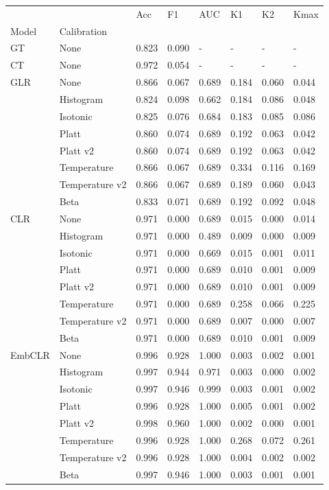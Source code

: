 \begin{tabular}{llllllll}
\toprule
 &  & Acc & F1 & AUC & K1 & K2 & Kmax \\
Model & Calibration &  &  &  &  &  &  \\
\midrule
GT & None & 0.823 & 0.090 & - & - & - & - \\
\cline{1-8}
CT & None & 0.972 & 0.054 & - & - & - & - \\
\cline{1-8}
\multirow[t]{8}{*}{GLR} & None & 0.866 & 0.067 & 0.689 & 0.184 & 0.060 & 0.044 \\
 & Histogram & 0.824 & 0.098 & 0.662 & 0.184 & 0.086 & 0.048 \\
 & Isotonic & 0.825 & 0.076 & 0.684 & 0.183 & 0.085 & 0.086 \\
 & Platt & 0.860 & 0.074 & 0.689 & 0.192 & 0.063 & 0.042 \\
 & Platt v2 & 0.860 & 0.074 & 0.689 & 0.192 & 0.063 & 0.042 \\
 & Temperature & 0.866 & 0.067 & 0.689 & 0.334 & 0.116 & 0.169 \\
 & Temperature v2 & 0.866 & 0.067 & 0.689 & 0.189 & 0.060 & 0.043 \\
 & Beta & 0.833 & 0.071 & 0.689 & 0.192 & 0.092 & 0.048 \\
\cline{1-8}
\multirow[t]{8}{*}{CLR} & None & 0.971 & 0.000 & 0.689 & 0.015 & 0.000 & 0.014 \\
 & Histogram & 0.971 & 0.000 & 0.489 & 0.009 & 0.000 & 0.009 \\
 & Isotonic & 0.971 & 0.000 & 0.669 & 0.015 & 0.001 & 0.011 \\
 & Platt & 0.971 & 0.000 & 0.689 & 0.010 & 0.001 & 0.009 \\
 & Platt v2 & 0.971 & 0.000 & 0.689 & 0.010 & 0.001 & 0.009 \\
 & Temperature & 0.971 & 0.000 & 0.689 & 0.258 & 0.066 & 0.225 \\
 & Temperature v2 & 0.971 & 0.000 & 0.689 & 0.007 & 0.000 & 0.007 \\
 & Beta & 0.971 & 0.000 & 0.689 & 0.010 & 0.001 & 0.009 \\
\cline{1-8}
\multirow[t]{8}{*}{EmbCLR} & None & 0.996 & 0.928 & 1.000 & 0.003 & 0.002 & 0.001 \\
 & Histogram & 0.997 & 0.944 & 0.971 & 0.003 & 0.000 & 0.002 \\
 & Isotonic & 0.997 & 0.946 & 0.999 & 0.003 & 0.001 & 0.002 \\
 & Platt & 0.996 & 0.928 & 1.000 & 0.005 & 0.001 & 0.002 \\
 & Platt v2 & 0.998 & 0.960 & 1.000 & 0.002 & 0.000 & 0.001 \\
 & Temperature & 0.996 & 0.928 & 1.000 & 0.268 & 0.072 & 0.261 \\
 & Temperature v2 & 0.996 & 0.928 & 1.000 & 0.004 & 0.002 & 0.002 \\
 & Beta & 0.997 & 0.946 & 1.000 & 0.003 & 0.001 & 0.001 \\
\cline{1-8}
\bottomrule
\end{tabular}
